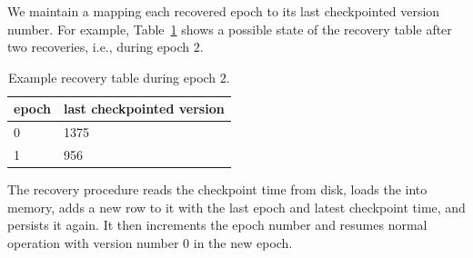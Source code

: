 We maintain a  mapping each recovered epoch to its last checkpointed version number. 
For example, Table~\ref{table:recovery} shows a possible state of the recovery table after two recoveries, i.e., during epoch $2$. 

\begin{table}
\begin{center}
\begin{tabular}{ll}
epoch & last checkpointed version \\
\hline
0 & 1375\\
1 &  956\\
\end{tabular}
\end{center}
\caption{Example recovery table during epoch $2$.}
\label{table:recovery}
\end{table} 
 
The recovery procedure reads the checkpoint time from disk, loads the  into memory, adds a new row to it with the last epoch and latest checkpoint time, and persists it again. It then increments the epoch number and resumes normal operation with version number $0$ in the new epoch.







